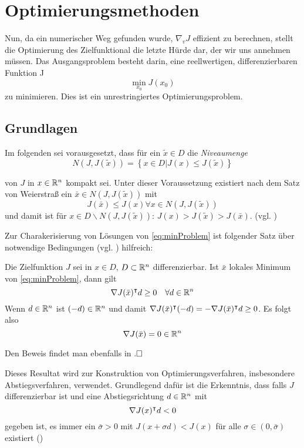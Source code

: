 \section{Optimierungsmethoden}

Nun, da ein numerischer Weg gefunden wurde, $\nabla_v J$ effizient zu berechnen, stellt die Optimierung des Zielfunktional die letzte Hürde dar, der wir uns annehmen müssen. Das Ausgangsproblem besteht darin, eine reellwertigen, differenzierbaren Funktion J
\begin{equation}
\label{eq:minProblem}
 \min_{x_0} J(x_0) 
\end{equation}
zu minimieren. Dies ist ein unrestringiertes Optimierungsproblem. 

\subsection{Grundlagen}
Im folgenden sei vorausgesetzt, dass für ein $\tilde x\in D$ die \textit{Niveaumenge}
 \begin{equation}
 \label{eq:niveauset}
  N(J,J(\tilde x)) = \left\{ x\in D \vert J(x)\leq J(\tilde x)\right\}
 \end{equation}

  

 von $J$ in $x\in \mathbb{R}^n$ kompakt sei. Unter dieser Voraussetzung existiert nach dem Satz von Weierstraß ein $\bar x \in N(J,J(\tilde x))$ mit 
 \[
  J(\bar x) \leq J(x) \forall x\in N(J,J(\tilde x))
 \]
 und damit ist für $x\in D\backslash N(J,J(\tilde x))$: $J(x)>J(\tilde x)> J(\bar x)$. (vgl. \cite[Satz 1.2.2]{alt2002nichtlineare})
 

Zur Charakerisierung von Lösungen von \eqref{eq:minProblem} ist folgender Satz über notwendige Bedingungen (vgl. \cite[vgl. Satz 3.1.1 ff.]{alt2002nichtlineare}) hilfreich:
\begin{theorem} 
\label{thm:optnotbed}
 Die Zielfunktion $J$ sei in $x\in D$, $D\subset \mathbb{R}^n$ differenzierbar. Ist $\bar x$ lokales Minimum von \eqref{eq:minProblem}, dann gilt
 \[
  \nabla J(\bar x)^\intercal d \geq 0 \quad \forall d\in \mathbb{R}^n
 \]
 Wenn $d\in \mathbb{R}^n$ ist $(-d)\in \mathbb{R}^n$ und damit $\nabla J(\bar x)^\intercal (-d) =  - \nabla J(\bar x)^\intercal d  \geq 0$. Es folgt also
 \[
  \nabla J(\bar x)  =0 \in \mathbb{R}^n
 \]
\end{theorem}
 Den Beweis findet man ebenfalls in \cite[vgl. Satz 3.1.1 ff]{alt2002nichtlineare}.$\proofend$

Dieses Resultat wird zur Konstruktion von Optimierungsverfahren, insbesondere Abstiegsverfahren, verwendet. 
Grundlegend dafür ist die Erkenntnis, dass falls $J$ differenzierbar ist und eine Abstiegsrichtung $d\in \mathbb{R}^n$ mit 
\[
\nabla J(x)^\intercal d<0 
\]
gegeben ist, es immer ein $\bar \sigma>0$ mit $J(x+\sigma d)< J(x)$ für alle $\sigma \in (0,\bar \sigma)$ existiert (\cite[vgl. Satz 4.1.1]{alt2002nichtlineare})


